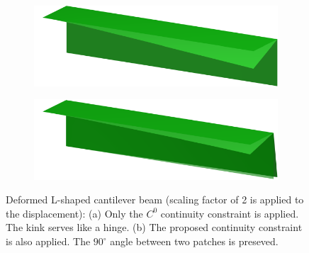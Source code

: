 \documentclass[preprint,12pt]{elsarticle}
\theoremstyle{remark}
\begin{document}
\begin{figure}[!hbt]
    \centering
    \captionsetup[subfigure]{font = footnotesize}
    \begin{subfigure}[b]{.49\textwidth}
        \centering
        \includegraphics[width = \textwidth]{L-beam-c0_result}
        \caption{}\label{fig:L-beam-deform-c0}
    \end{subfigure}
    \begin{subfigure}[b]{.49\textwidth}
        \centering
        \includegraphics[width = \textwidth]{L-beam-c1_result}
        \caption{}\label{fig:L-beam-deform-c1}
    \end{subfigure}
	\caption{Deformed L-shaped cantilever beam (scaling factor of 2 is applied to the displacement): (a) Only the $C^0$ continuity constraint is applied. The kink serves like a hinge. (b) The proposed continuity constraint is also applied. The $90^\circ$ angle between two patches is preseved.}\label{fig:L-beam-deform}
\end{figure}

\clearpage


\end{document}
